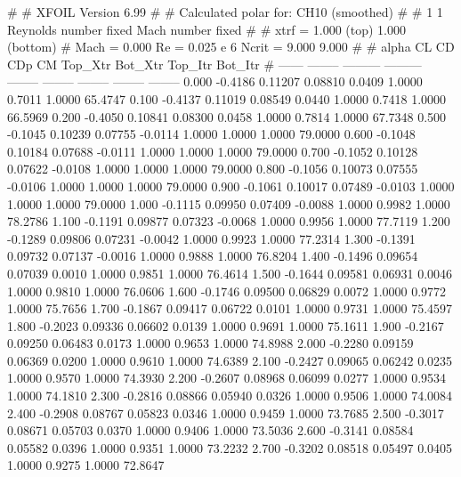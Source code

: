 #  
#       XFOIL         Version 6.99
#  
# Calculated polar for: CH10 (smoothed)                                 
#  
# 1 1 Reynolds number fixed          Mach number fixed         
#  
# xtrf =   1.000 (top)        1.000 (bottom)  
# Mach =   0.000     Re =     0.025 e 6     Ncrit =   9.000  9.000
#  
#   alpha    CL        CD       CDp       CM     Top_Xtr  Bot_Xtr  Top_Itr  Bot_Itr
#  ------ -------- --------- --------- -------- -------- -------- -------- --------
   0.000  -0.4186   0.11207   0.08810   0.0409   1.0000   0.7011   1.0000  65.4747
   0.100  -0.4137   0.11019   0.08549   0.0440   1.0000   0.7418   1.0000  66.5969
   0.200  -0.4050   0.10841   0.08300   0.0458   1.0000   0.7814   1.0000  67.7348
   0.500  -0.1045   0.10239   0.07755  -0.0114   1.0000   1.0000   1.0000  79.0000
   0.600  -0.1048   0.10184   0.07688  -0.0111   1.0000   1.0000   1.0000  79.0000
   0.700  -0.1052   0.10128   0.07622  -0.0108   1.0000   1.0000   1.0000  79.0000
   0.800  -0.1056   0.10073   0.07555  -0.0106   1.0000   1.0000   1.0000  79.0000
   0.900  -0.1061   0.10017   0.07489  -0.0103   1.0000   1.0000   1.0000  79.0000
   1.000  -0.1115   0.09950   0.07409  -0.0088   1.0000   0.9982   1.0000  78.2786
   1.100  -0.1191   0.09877   0.07323  -0.0068   1.0000   0.9956   1.0000  77.7119
   1.200  -0.1289   0.09806   0.07231  -0.0042   1.0000   0.9923   1.0000  77.2314
   1.300  -0.1391   0.09732   0.07137  -0.0016   1.0000   0.9888   1.0000  76.8204
   1.400  -0.1496   0.09654   0.07039   0.0010   1.0000   0.9851   1.0000  76.4614
   1.500  -0.1644   0.09581   0.06931   0.0046   1.0000   0.9810   1.0000  76.0606
   1.600  -0.1746   0.09500   0.06829   0.0072   1.0000   0.9772   1.0000  75.7656
   1.700  -0.1867   0.09417   0.06722   0.0101   1.0000   0.9731   1.0000  75.4597
   1.800  -0.2023   0.09336   0.06602   0.0139   1.0000   0.9691   1.0000  75.1611
   1.900  -0.2167   0.09250   0.06483   0.0173   1.0000   0.9653   1.0000  74.8988
   2.000  -0.2280   0.09159   0.06369   0.0200   1.0000   0.9610   1.0000  74.6389
   2.100  -0.2427   0.09065   0.06242   0.0235   1.0000   0.9570   1.0000  74.3930
   2.200  -0.2607   0.08968   0.06099   0.0277   1.0000   0.9534   1.0000  74.1810
   2.300  -0.2816   0.08866   0.05940   0.0326   1.0000   0.9506   1.0000  74.0084
   2.400  -0.2908   0.08767   0.05823   0.0346   1.0000   0.9459   1.0000  73.7685
   2.500  -0.3017   0.08671   0.05703   0.0370   1.0000   0.9406   1.0000  73.5036
   2.600  -0.3141   0.08584   0.05582   0.0396   1.0000   0.9351   1.0000  73.2232
   2.700  -0.3202   0.08518   0.05497   0.0405   1.0000   0.9275   1.0000  72.8647
